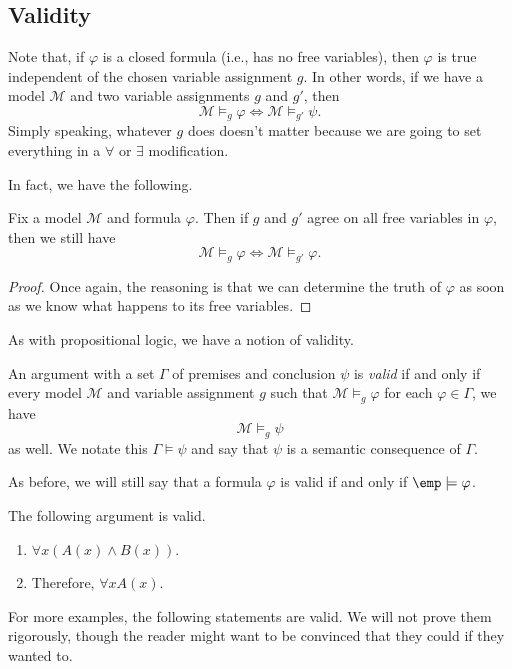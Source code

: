 \documentclass[../notes.tex]{subfiles}
\begin{document}
\subsection{Validity}
Note that, if $\varphi$ is a closed formula (i.e., has no free variables), then $\varphi$ is true independent of the chosen variable assignment $g$. In other words, if we have a model $\mathcal M$ and two variable assignments $g$ and $g'$, then
\[\mathcal M\models_g\varphi\iff\mathcal M\models_{g'}\psi.\]
Simply speaking, whatever $g$ does doesn't matter because we are going to set everything in a $\forall$ or $\exists$ modification.

In fact, we have the following.
\begin{proposition}
	Fix a model $\mathcal M$ and formula $\varphi$. Then if $g$ and $g'$ agree on all free variables in $\varphi$, then we still have
	\[\mathcal M\models_g\varphi\iff\mathcal M\models_{g'}\varphi.\]
\end{proposition}
\begin{proof}
	Once again, the reasoning is that we can determine the truth of $\varphi$ as soon as we know what happens to its free variables.
\end{proof}
As with propositional logic, we have a notion of validity.
\begin{definition}[Valid]
	An argument with a set $\Gamma$ of premises and conclusion $\psi$ is \textit{valid} if and only if every model $\mathcal M$ and variable assignment $g$ such that $\mathcal M\models_g\varphi$ for each $\varphi\in\Gamma$, we have
	\[\mathcal M\models_g\psi\]
	as well. We notate this $\Gamma\models\psi$ and say that $\psi$ is a semantic consequence of $\Gamma$.
\end{definition}
As before, we will still say that a formula $\varphi$ is valid if and only if $\emp\models\varphi$.
\begin{example}
	The following argument is valid.
	\begin{enumerate}
		\item $\forall x(A(x)\land B(x))$.
		\item Therefore, $\forall xA(x)$.
	\end{enumerate}
\end{example}
For more examples, the following statements are valid. We will not prove them rigorously, though the reader might want to be convinced that they could if they wanted to.
\end{document}

